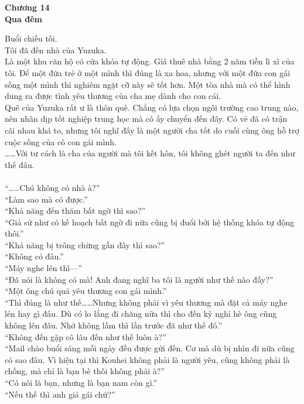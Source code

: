 \documentclass[12pt,a4paper, twosides]{book}
\begin{document}
    \begin{center}
    \textbf{\large Chương 14 \\ Qua đêm}
    \end{center}
    \noindent
Buổi chiều tối.\\
Tôi đã đến nhà của Yuzuka.\\
Là một khu căn hộ có cửa khóa tự động. Giá thuê nhà bằng 2 năm tiền lì xì của tôi. Để một đứa trẻ ở một mình thì đúng là xa hoa, nhưng với một đứa con gái sống một mình thì nghiêm ngặt cỡ này sẽ tốt hơn. Một tòa nhà mà có thể hình dung ra được tình yêu thương của cha mẹ dành cho con cái.\\
Quê của Yuzuka rất ư là thôn quê. Chẳng có lựa chọn ngôi trường cao trung nào, nên nhân dịp tốt nghiệp trung học mà cô ấy chuyển đến đây. Có vẻ đã có trận cãi nhau khá to, nhưng tôi nghĩ đấy là một người cha tốt do cuối cùng ông hỗ trợ cuộc sống của cô con gái mình.\\
……Với tư cách là cha của người mà tôi kết hôn, tôi không ghét người ta đến như thế đâu.\\
\\
“……Chú không có nhà à?”\\
“Làm sao mà có được.”\\
“Khả năng đến thăm bất ngờ thì sao?”\\
“Giả sử như có kế hoạch bất ngờ đi nữa cũng bị đuổi bởi hệ thống khóa tự động thôi.”\\
“Khả năng bị trông chừng gần đây thì sao?”\\
“Không có đâu.”\\
“Máy nghe lén thì—”\\
“Đã nói là không có mà! Anh đang nghĩ ba tôi là người như thế nào đấy?”\\
“Một ông chú quá yêu thương con gái mình.”\\
“Thì đúng là như thế……Nhưng không phải vì yêu thương mà đặt cả máy nghe lén hay gì đâu. Dù có lo lắng đi chăng nữa thì cho đến kỳ nghỉ hè ông cũng không lên đâu. Nhớ không lầm thì lần trước đã như thế đó.”\\
“Không đến gặp cô lâu đến như thế luôn à?”\\
“Mail chào buổi sáng mỗi ngày đều được gửi đến. Cơ mà dù bị nhìn đi nữa cũng có sao đâu. Vì hiện tại thì Kouhei không phải là người yêu, cũng không phải là chồng, mà chỉ là bạn bè thôi không phải à?”\\
“Có nói là bạn, nhưng là bạn nam còn gì.”\\
“Nếu thế thì anh giả gái chứ?”\\
\end{document}

